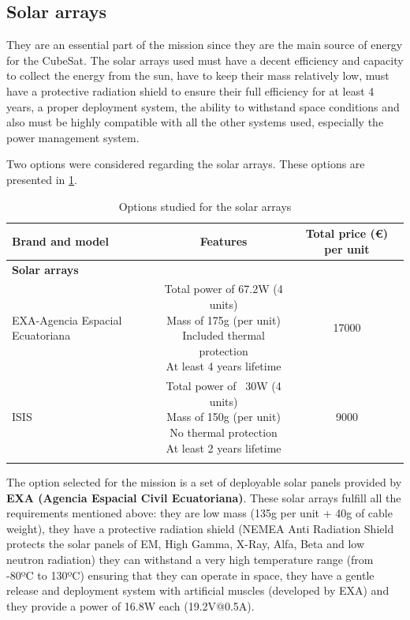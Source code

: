 \subsection{Solar arrays}
They are an essential part of the mission since they are the main source of energy for the CubeSat. The solar arrays used must have a decent efficiency and capacity to collect the energy from the sun, have to keep their mass relatively low, must have a protective radiation shield to ensure their full efficiency for at least 4 years, a proper deployment system, the ability to withstand space conditions and also must be highly compatible with all the other systems used, especially the power management system.

Two options were considered regarding the solar arrays. These options are presented in \ref{solararraysoptions}.

\begin{longtable}{| p{4cm} | c | c | }
\hline
\rowcolor[gray]{0.80}	\textbf{Brand and model} &  \textbf{Features}     & \textbf{Total price (\euro) per unit}   \\
\hline
\endfirsthead

\rowcolor[gray]{0.85} \textbf{Solar arrays} &  &  \\
	   EXA-Agencia Espacial Ecuatoriana & \makecell{Total power of 67.2W (4 units)\\ Mass of 175g (per unit) \\ Included thermal protection \\At least 4 years lifetime} & 17000 \\
	   \hline
	   ISIS & \makecell{Total power of ~30W (4 units) \\ Mass of 150g (per unit) \\ No thermal protection \\At least 2 years lifetime} & 9000 \\
	   \hline
\caption{Options studied for the solar arrays}
\label{solararraysoptions}
\end{longtable}

The option selected for the mission is a set of deployable solar panels provided by \textbf{EXA (Agencia Espacial Civil Ecuatoriana)}. These solar arrays fulfill all the requirements mentioned above: they are low mass (135g per unit + 40g of cable weight), they have a protective radiation shield (NEMEA Anti Radiation Shield protects the solar panels of EM, High Gamma, X-Ray, Alfa, Beta and low neutron radiation) they can withstand a very high temperature range (from -80ºC to 130ºC) ensuring that they can operate in space, they have a gentle release and deployment system with artificial muscles (developed by EXA) and they provide a power of 16.8W each (19.2V@0.5A).

